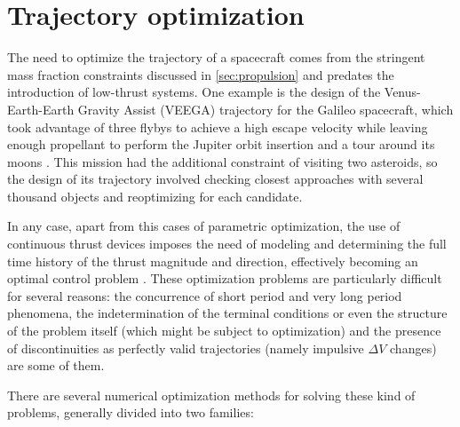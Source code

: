 \section{Trajectory optimization}

The need to optimize the trajectory of a spacecraft comes from the stringent mass fraction constraints discussed in \ref{sec:propulsion} and predates the introduction of low-thrust systems. One example is the design of the Venus-Earth-Earth Gravity Assist (VEEGA) trajectory for the Galileo spacecraft, which took advantage of three flybys to achieve a high escape velocity while leaving enough propellant to perform the Jupiter orbit insertion and a tour around its moons \cite{damario1989galileo}. This mission had the additional constraint of visiting two asteroids, so the design of its trajectory involved checking closest approaches with several thousand objects and reoptimizing for each candidate.
% 
% 

In any case, apart from this cases of parametric optimization, the use of continuous thrust devices imposes the need of modeling and determining the full time history of the thrust magnitude and direction, effectively becoming an optimal control problem \cite{conway2010spacecraft}. These optimization problems are particularly difficult for several reasons: the concurrence of short period and very long period phenomena, the indetermination of the terminal conditions or even the structure of the problem itself (which might be subject to optimization) and the presence of discontinuities as perfectly valid trajectories (namely impulsive $\Delta V$ changes) are some of them.

There are several numerical optimization methods for solving these kind of problems, generally divided into two families:
% 
% 
%
%


